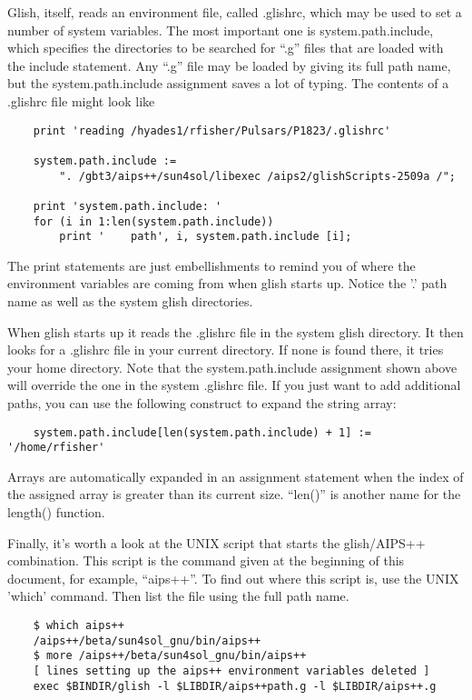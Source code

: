     Glish, itself, reads an environment file, called .glishrc, which may be
used to set a number of system variables.  The most important one is
system.path.include, which specifies the directories to be searched for
``.g'' files that are loaded with the include statement.  Any ``.g'' file may
be loaded by giving its full path name, but the system.path.include
assignment saves a lot of typing.  The contents of a .glishrc file might
look like

\begin{verbatim}
	print 'reading /hyades1/rfisher/Pulsars/P1823/.glishrc'
 
	system.path.include := 
	    ". /gbt3/aips++/sun4sol/libexec /aips2/glishScripts-2509a /";
 
	print 'system.path.include: '
	for (i in 1:len(system.path.include))
	    print '    path', i, system.path.include [i];
\end{verbatim}

The print statements are just embellishments to remind you of where the
environment variables are coming from when glish starts up.  Notice the '.'
path name as well as the system glish directories.

    When glish starts up it reads the .glishrc file in the system glish
directory.  It then looks for a .glishrc file in your current directory.
If none is found there, it tries your home directory.  Note that the
system.path.include assignment shown above will override the one in the
system .glishrc file.  If you just want to add additional paths, you can
use the following construct to expand the string array:

\begin{verbatim}
	system.path.include[len(system.path.include) + 1] := '/home/rfisher'
\end{verbatim}

Arrays are automatically expanded in an assignment statement when the
index of the assigned array is greater than its current size.  ``len()'' is
another name for the length() function.

    Finally, it's worth a look at the UNIX script that starts the
glish/AIPS++ combination.  This script is the command given at the
beginning of this document, for example, ``aips++''.  To find out where this
script is, use the UNIX 'which' command.  Then list the file using the full
path name.

\begin{verbatim}
	$ which aips++
	/aips++/beta/sun4sol_gnu/bin/aips++
	$ more /aips++/beta/sun4sol_gnu/bin/aips++
	[ lines setting up the aips++ environment variables deleted ]
	exec $BINDIR/glish -l $LIBDIR/aips++path.g -l $LIBDIR/aips++.g
\end{verbatim}

